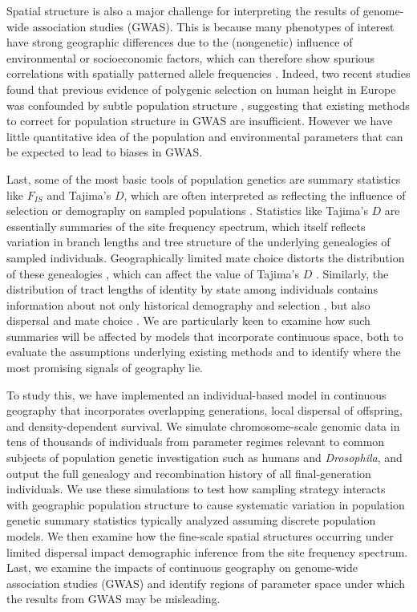 \documentclass[10pt,twoside,lineno,hidelinks]{preprint}
\begin{document}
Spatial structure is also a major challenge for interpreting the results of genome-wide association studies (GWAS). This is because many phenotypes of interest have strong geographic differences due to the (nongenetic) influence of environmental or socioeconomic factors,
which can therefore show spurious correlations with spatially patterned allele frequencies \citep{Bulik-Sullivan2015,Mathieson2012}. Indeed, two recent studies found that previous evidence of polygenic selection on human height in Europe was confounded by subtle population structure \citep{Sohail2018,Berg2018}, suggesting that existing methods to correct for population structure in GWAS are insufficient. However we have little quantitative idea of the population and environmental parameters that can be expected to lead to biases in GWAS. 

Last, some of the most basic tools of population genetics are summary statistics like $F_{IS}$ and Tajima's $D$, which are often interpreted as reflecting the influence of selection or demography on sampled populations \citep{tajima1989statistical}. Statistics like Tajima's $D$ are essentially summaries of the site frequency spectrum, which itself reflects variation in branch lengths and tree structure of the underlying genealogies of sampled individuals. Geographically limited mate choice distorts the distribution of these genealogies \citep{Maruyama1972,Wakeley1999}, which can affect the value of Tajima's $D$ \citep{Stadler2009}. Similarly, the distribution of tract lengths of identity by state among individuals contains information about not only historical demography \citep{Harris2013,ralph2013geography} and selection \citep{Garud2015}, but also dispersal and mate choice \citep{Ringbauer2017,Baharian2016}. 
We are particularly keen to examine how such summaries will be affected by models that incorporate continuous space, both to evaluate the assumptions underlying existing methods and to identify where the most promising signals of geography lie.

To study this, we have implemented an individual-based model in continuous geography 
that incorporates overlapping generations, local dispersal of offspring, and density-dependent survival. 
We simulate chromosome-scale genomic data in tens of thousands of individuals from parameter regimes relevant to common subjects of population genetic investigation such as humans and \textit{Drosophila}, and output the full genealogy and recombination history of all final-generation individuals. 
We use these simulations to test how sampling strategy interacts with geographic population structure to cause systematic variation in population genetic summary statistics 
typically analyzed assuming discrete population models. 
We then examine how the fine-scale spatial structures occurring under limited dispersal impact demographic inference from the site frequency spectrum. 
Last, we examine the impacts of continuous geography on genome-wide association studies (GWAS) and identify regions of parameter space under which the results from GWAS may be misleading.
\end{document}
